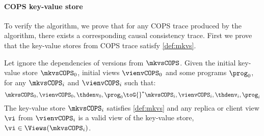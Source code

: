 \paragraph{\bf COPS key-value store}
To verify the algorithm, we prove that for any COPS trace produced by the algorithm,
there exists a corresponding causal consistency trace.
First we prove that the key-value stores from COPS trace satisfy \cref{def:mkvs}.

\begin{theorem}
    \label{thm:cops-key-value-well-form}
    Let ignore the dependencies of versions from \( \mkvsCOPS \).
    Given the initial key-value store \( \mkvsCOPS_0 \), initial views \( \vienvCOPS_0 \) and some programs \( \prog_0 \), for any \( \mkvsCOPS_i \) and \( \vienvCOPS_i \)  such that: 
    \[
        \mkvsCOPS_0, \vienvCOPS_0, \thdenv_0, \prog_0 {\toG{}}^* \mkvsCOPS_i, \vienvCOPS_i, \thdenv_i, \prog_i
    \]
    The key-value store \( \mkvsCOPS_i \) satisfies \cref{def:mkvs} and any replica or client view \( \vi \) from \( \vienvCOPS_i \) is a valid view of the key-value store, \ie \( \vi \in \Views(\mkvsCOPS_i) \).
\end{theorem}
